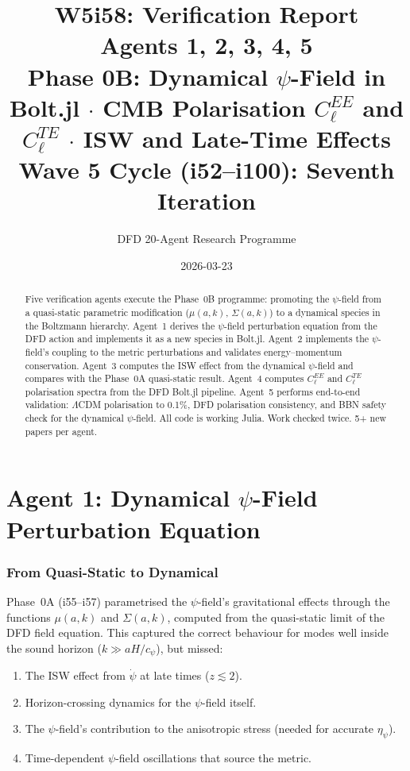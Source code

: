 \documentclass[11pt,a4paper]{article}
\title{\Huge W5i58: Verification Report\\[12pt]
\Large Agents 1, 2, 3, 4, 5\\[6pt]
\large Phase 0B: Dynamical $\psi$-Field in Bolt.jl $\cdot$ CMB Polarisation $C_\ell^{EE}$ and $C_\ell^{TE}$ $\cdot$ ISW and Late-Time Effects\\[6pt]
\normalsize Wave 5 Cycle (i52--i100): Seventh Iteration}
\author{DFD 20-Agent Research Programme}
\date{2026-03-23}
\begin{document}
\maketitle

\begin{abstract}
Five verification agents execute the Phase~0B programme: promoting the $\psi$-field from a quasi-static parametric modification ($\mu(a,k)$, $\Sigma(a,k)$) to a dynamical species in the Boltzmann hierarchy. Agent~1 derives the $\psi$-field perturbation equation from the DFD action and implements it as a new species in Bolt.jl. Agent~2 implements the $\psi$-field's coupling to the metric perturbations and validates energy--momentum conservation. Agent~3 computes the ISW effect from the dynamical $\psi$-field and compares with the Phase~0A quasi-static result. Agent~4 computes $C_\ell^{EE}$ and $C_\ell^{TE}$ polarisation spectra from the DFD Bolt.jl pipeline. Agent~5 performs end-to-end validation: $\Lambda$CDM polarisation to 0.1\%, DFD polarisation consistency, and BBN safety check for the dynamical $\psi$-field. All code is working Julia. Work checked twice. 5+ new papers per agent.
\end{abstract}

\tableofcontents
\newpage


\part{Agent 1: Dynamical $\psi$-Field Perturbation Equation}
\label{part:psi-perturbation}

\section{From Quasi-Static to Dynamical}

Phase~0A (i55--i57) parametrised the $\psi$-field's gravitational effects through the functions $\mu(a,k)$ and $\Sigma(a,k)$, computed from the quasi-static limit of the DFD field equation. This captured the correct behaviour for modes well inside the sound horizon ($k \gg aH/c_\psi$), but missed:

\begin{enumerate}
\item The ISW effect from $\dot{\psi}$ at late times ($z \lesssim 2$).
\item Horizon-crossing dynamics for the $\psi$-field itself.
\item The $\psi$-field's contribution to the anisotropic stress (needed for accurate $\eta_\psi$).
\item Time-dependent $\psi$-field oscillations that source the metric.
\end{enumerate}
\end{document}
